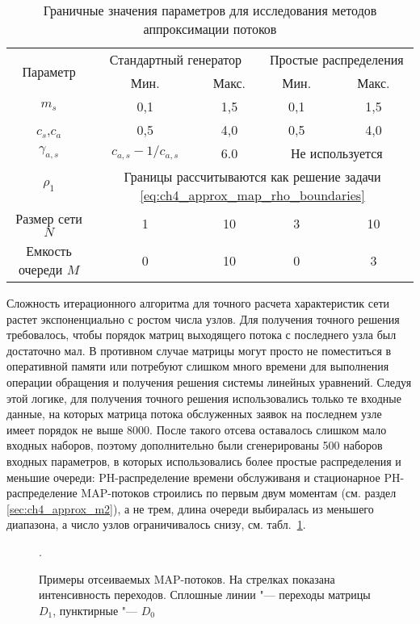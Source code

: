 \begin{table}[h]
  \centering
  \caption{\label{tab:ch4_results_approx_input_range} Граничные значения параметров для исследования методов аппроксимации потоков}
  \begin{tabular}{|c|cc|cc|}
    \hline
    \multirow{2}{*}{Параметр}
      &\multicolumn{2}{c|}{Стандартный генератор}&\multicolumn{2}{c|}{Простые распределения}\\
                    &Мин.   &Макс.    &Мин.   &Макс.\\
      \hline
      $m_s$           &0,1       &1,5        &0,1        &1,5\\
      $c_s$,$c_a$     &0,5       &4,0        &0,5        &4,0\\
      $\gamma_{a,s}$  &$c_{a,s} - 1/c_{a,s}$ &6.0    &\multicolumn{2}{c|}{Не используется}\\
    $\rho_1$        &\multicolumn{4}{c|}{Границы рассчитываются как решение задачи
      \eqref{eq:ch4_approx_map_rho_boundaries}}\\
    Размер сети $N$ &1          &10        &3           &10\\
    Емкость очереди $M$ &0      &10        &0           &3\\
    \hline
  \end{tabular}
\end{table}


Сложность итерационного алгоритма для точного расчета характеристик сети растет экспоненциально с ростом числа узлов. Для получения точного решения требовалось, чтобы порядок матриц выходящего потока с последнего узла был достаточно мал. В противном случае матрицы могут просто не поместиться в оперативной памяти или потребуют слишком много времени для выполнения операции обращения и получения решения системы линейных уравнений. Следуя этой логике, для получения точного решения использовались только те входные данные, на которых матрица потока обслуженных заявок на последнем узле имеет порядок не выше 8000. После такого отсева оставалось слишком мало входных наборов, поэтому дополнительно были сгенерированы 500 наборов входных параметров, в которых использовались более простые распределения и меньшие очереди: PH-распределение времени обслуживаня и стационарное PH-распределение MAP-потоков строились по первым двум моментам (см. раздел \ref{sec:ch4_approx_m2}), а не трем, длина очереди выбиралась из меньшего диапазона, а число узлов ограничивалось снизу, см. табл.~\ref{tab:ch4_results_approx_input_range}.

\begin{figure}[h]
  \caption{Примеры отсеиваемых MAP-потоков. На стрелках показана интенсивность переходов. Сплошные линии "--- переходы матрицы $D_1$, пунктирные "--- $D_0$}.\label{fig:ch4_results_bad_maps}
\end{figure}

